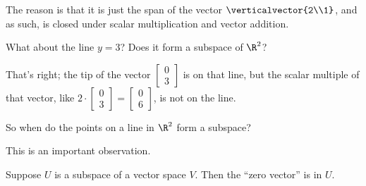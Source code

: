 \documentclass{ximera}
\begin{document}
\begin{question}
\begin{solution}
\begin{hint}
      The reason is that it is just the span of the vector
      $\verticalvector{2\\1}$, and as such, is closed under scalar
      multiplication and vector addition.
    \end{hint}
    \begin{multiple-choice}
    \end{multiple-choice}
  \end{solution}


  \begin{solution}
    \begin{hint}
      \begin{question}
        What about the line $y = 3$?  Does it form a subspace of $\R^2$?
        
        \begin{solution}
          \begin{multiple-choice}
          \end{multiple-choice}
        \end{solution}

        That's right; the tip of the vector $\begin{bmatrix} 0 \\
          3 \end{bmatrix}$ is on that line, but the scalar multiple of
        that vector, like $2 \cdot \begin{bmatrix} 0 \\
          3 \end{bmatrix} = \begin{bmatrix} 0 \\ 6 \end{bmatrix}$, is
        not on the line.
      \end{question}
    \end{hint}

    So when do the points on a line in $\R^2$ form a subspace?
    \begin{multiple-choice}
    \end{multiple-choice}
  \end{solution}

  This is an important observation.

  \begin{observation}
    Suppose $U$ is a subspace of a vector space $V$.  Then the ``zero vector'' is in $U$.
  \end{observation}

\end{question}
\end{document}
